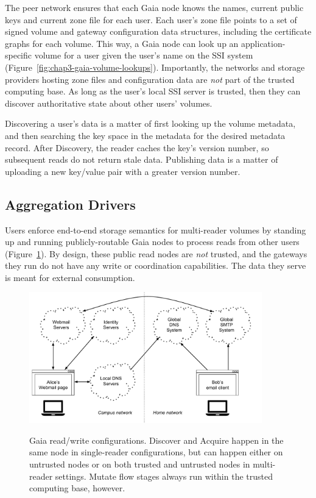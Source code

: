 The peer network ensures that each Gaia node knows the names, current public
keys and current zone file for each user.  Each user's
zone file points to a set of signed volume and gateway configuration data
structures, including the certificate graphs for each volume. 
This way, a Gaia node can
look up an application-specific volume for a user given the user's name on the
SSI system (Figure~\ref{fig:chap3-gaia-volume-lookups}).  Importantly, the networks and storage
providers hosting zone files and configuration data are \emph{not} part
of the trusted computing base.  As long as the user's local SSI server is
trusted, then they can discover authoritative state about other users' volumes.

Discovering a user's data is a matter of first looking up the volume metadata, and then
searching the key space in the metadata for the desired metadata record.  After
Discovery, the reader caches the key's version number, so subsequent reads do
not return stale data.  Publishing data is a matter of uploading a new key/value
pair with a greater version number.

\subsection{Aggregation Drivers}

Users enforce end-to-end storage semantics for multi-reader volumes by standing up and running
publicly-routable Gaia nodes to process reads from other users
(Figure~\ref{fig:chap3-gaia-reads-writes}).  By design,
these public read nodes are \emph{not} trusted, and the gateways they run do not
have any write or coordination capabilities.  The data they serve is
meant for external consumption.

\begin{figure}[h]
   \caption{Gaia read/write configurations.  Discover and Acquire happen in the
   same node in single-reader configurations, but can happen either on untrusted
   nodes or on both trusted and untrusted nodes in multi-reader settings.
   Mutate flow stages always run within the trusted computing base, however.}
   \centering
   \includegraphics[width=0.9\textwidth,page=19]{figures/dissertation-figures}
   \label{fig:chap3-gaia-reads-writes}
\end{figure}

